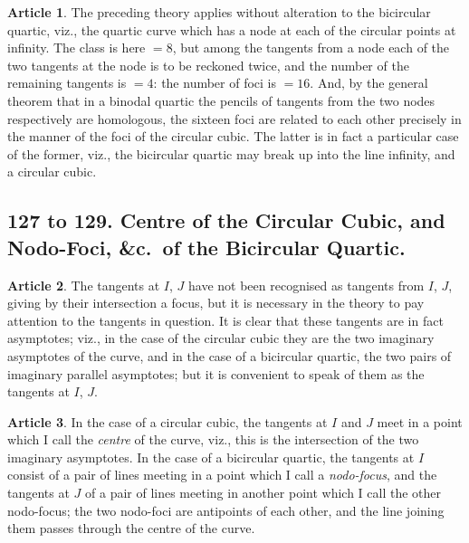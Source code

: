 \documentclass[11pt,a4paper]{article}
\theoremstyle{definition}
\newtheorem{art}{Article}
\begin{document}
\begin{art}
The preceding theory applies without alteration to the bicircular quartic, viz., the quartic curve which has a node at each of the circular points at infinity. The class is here $= 8$, but among the tangents from a node each of the two tangents at the node is to be reckoned twice, and the number of the remaining tangents is $= 4$: the number of foci is $= 16$. And, by the general theorem that in a binodal quartic the pencils of tangents from the two nodes respectively are homologous, the sixteen foci are related to each other precisely in the manner of the foci of the circular cubic. The latter is in fact a particular case of the former, viz., the bicircular quartic may break up into the line infinity, and a circular cubic.
\end{art}

\subsection{127 to 129. Centre of the Circular Cubic, and Nodo-Foci, \&c.\ of the Bicircular Quartic.}

\begin{art}
The tangents at $I$, $J$ have not been recognised as tangents from $I$, $J$, giving by their intersection a focus, but it is necessary in the theory to pay attention to the tangents in question. It is clear that these tangents are in fact asymptotes; viz., in the case of the circular cubic they are the two imaginary asymptotes of the curve, and in the case of a bicircular quartic, the two pairs of imaginary parallel asymptotes; but it is convenient to speak of them as the tangents at $I$, $J$.
\end{art}

\begin{art}
In the case of a circular cubic, the tangents at $I$ and $J$ meet in a point which I call the \textit{centre} of the curve, viz., this is the intersection of the two imaginary asymptotes. In the case of a bicircular quartic, the tangents at $I$ consist of a pair of lines meeting in a point which I call a \textit{nodo-focus}, and the tangents at $J$ of a pair of lines meeting in another point which I call the other nodo-focus; the two nodo-foci are antipoints of each other, and the line joining them passes through the centre of the curve.
\end{art}
\end{document}
